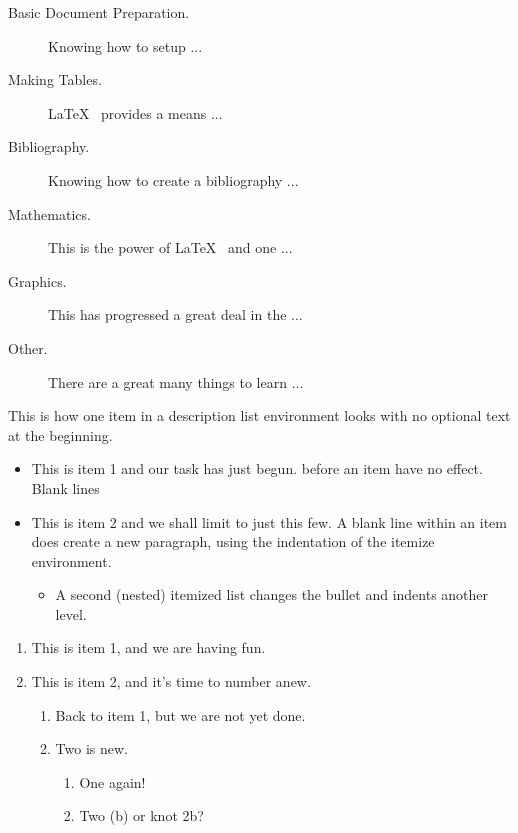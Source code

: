 \documentclass[12pt]{article}
\begin{document}
\begin{description}
	\item [Basic Document Preparation.] Knowing how to setup ...
	\item [Making Tables.] \LaTeX~ provides a means ...
	\item [Bibliography.] Knowing how to create a bibliography ...
	\item [Mathematics.] This is the power of \LaTeX~ and one ...
	\item [Graphics.] This has progressed a great deal in the ...
	\item [Other.] There are a great many things to learn ...
\end{description}

\begin{description}
	\item \textsf{This is how one item in a description list
		environment looks with no optional text at the beginning.}
\end{description}

\begin{itemize}
	\item This is item 1 and our task has just begun.
	before an item have no effect.
	Blank lines
	\item This is item 2 and we shall limit to just this few.
	A blank line within an item does create a new paragraph,
	using the indentation of the itemize environment.
	\begin{itemize}
		\item A second (nested) itemized list changes the bullet
		and indents another level.
	\end{itemize}
\end{itemize}

\begin{enumerate}
	\item This is item 1, and we are having fun.
	\item This is item 2, and it’s time to number anew.
	\begin{enumerate}
		\item Back to item 1, but we are not yet done.
		\item Two is new.
		\begin{enumerate}
			\item One again!
			\item Two (b) or knot 2b?
		\end{enumerate}
	\end{enumerate}
\end{enumerate}
\end{document}
